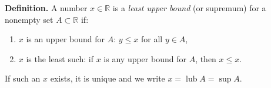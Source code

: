 \textbf{Definition.} A number $x \in \mathbb{R}$ is a \textit{least upper bound} (or supremum) for a nonempty set $A \subset \mathbb{R}$ if:
\begin{enumerate}
\item $x$ is an upper bound for $A$: $y \leq x$ for all $y \in A$,
\item $x$ is the least such: if $x$ is any upper bound for $A$, then $x \leq x$.
\end{enumerate}
If such an $x$ exists, it is unique and we write $x = \operatorname{lub} A = \sup A$.
